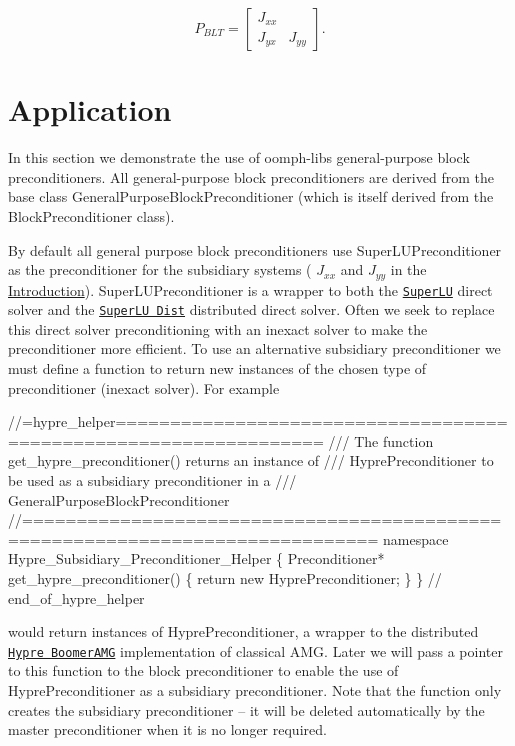 \[ P_{BLT}=\left[ \begin{array}{cc} J_{xx}&\\ J_{yx}&J_{yy} \end{array} \right]. \]\hypertarget{index_application}{}\section{Application}\label{index_application}
In this section we demonstrate the use of {\ttfamily oomph-\/lib\textquotesingle{}s} general-\/purpose block preconditioners. All general-\/purpose block preconditioners are derived from the base class {\ttfamily General\+Purpose\+Block\+Preconditioner} (which is itself derived from the {\ttfamily Block\+Preconditioner} class).

By default all general purpose block preconditioners use {\ttfamily Super\+L\+U\+Preconditioner} as the preconditioner for the subsidiary systems ( $J_{xx}$ and $J_{yy}$ in the \hyperlink{index_introduction}{Introduction}). {\ttfamily Super\+L\+U\+Preconditioner} is a wrapper to both the \href{http://crd.lbl.gov/~xiaoye/SuperLU/#superlu}{\tt {\ttfamily Super\+LU}} direct solver and the \href{http://crd.lbl.gov/~xiaoye/SuperLU/#superlu_dist}{\tt {\ttfamily Super\+LU Dist}} distributed direct solver. Often we seek to replace this direct solver preconditioning with an inexact solver to make the preconditioner more efficient. To use an alternative subsidiary preconditioner we must define a function to return new instances of the chosen type of preconditioner (inexact solver). For example  
\begin{DoxyCodeInclude}
\textcolor{comment}{//=hypre\_helper=================================================================}
\textcolor{comment}{/// The function get\_hypre\_preconditioner() returns an instance of }
\textcolor{comment}{}\textcolor{comment}{/// HyprePreconditioner to be used as a subsidiary preconditioner in a}
\textcolor{comment}{}\textcolor{comment}{/// GeneralPurposeBlockPreconditioner}
\textcolor{comment}{}\textcolor{comment}{//==============================================================================}
\textcolor{keyword}{namespace }Hypre\_Subsidiary\_Preconditioner\_Helper
\{
 Preconditioner* get\_hypre\_preconditioner()
 \{
  \textcolor{keywordflow}{return} \textcolor{keyword}{new} HyprePreconditioner; 
 \}
\} \textcolor{comment}{// end\_of\_hypre\_helper}

\end{DoxyCodeInclude}


would return instances of {\ttfamily Hypre\+Preconditioner}, a wrapper to the distributed \href{https://computation.llnl.gov/casc/linear_solvers/sls_hypre.html}{\tt {\ttfamily Hypre Boomer\+A\+MG}} implementation of classical A\+MG. Later we will pass a pointer to this function to the block preconditioner to enable the use of {\ttfamily Hypre\+Preconditioner} as a subsidiary preconditioner. Note that the function only creates the subsidiary preconditioner -- it will be deleted automatically by the master preconditioner when it is no longer required.

